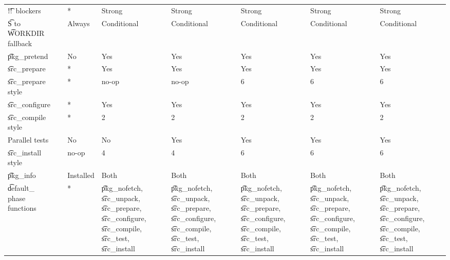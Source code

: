 \begin{landscape}
\begin{longtable}{llP{7.5em}P{7.5em}P{7.5em}P{7.5em}P{7.5em}P{7.5em}}
\t{!!}\ blockers &  &
    * & Strong & Strong & Strong & Strong & Strong \\

\t{S} to \t{WORKDIR} fallback &  &
    Always & Conditional & Conditional & Conditional & Conditional & Conditional \\

\t{pkg_pretend} &  &
    No & Yes & Yes & Yes & Yes & Yes \\

\t{src_prepare} &  &
    * & Yes & Yes & Yes & Yes & Yes \\

\t{src_prepare} style &  &
    * & no-op & no-op & 6 & 6 & 6 \\

\t{src_configure} &  &
    * & Yes & Yes & Yes & Yes & Yes \\

\t{src_compile} style &  &
    * & 2 & 2 & 2 & 2 & 2 \\

Parallel tests &  &
    No & No & Yes & Yes & Yes & Yes \\

\t{src_install} style &  &
    no-op & 4 & 4 & 6 & 6 & 6 \\

\t{pkg_info} &  &
    Installed & Both & Both & Both & Both & Both \\

\t{default_} phase functions &  &
    * &
    \t{pkg_nofetch}, \t{src_unpack}, \t{src_prepare}, \t{src_configure},
        \t{src_compile}, \t{src_test}, \t{src_install} &
    \t{pkg_nofetch}, \t{src_unpack}, \t{src_prepare}, \t{src_configure},
        \t{src_compile}, \t{src_test}, \t{src_install} &
    \t{pkg_nofetch}, \t{src_unpack}, \t{src_prepare}, \t{src_configure},
        \t{src_compile}, \t{src_test}, \t{src_install} &
    \t{pkg_nofetch}, \t{src_unpack}, \t{src_prepare}, \t{src_configure},
        \t{src_compile}, \t{src_test}, \t{src_install} &
    \t{pkg_nofetch}, \t{src_unpack}, \t{src_prepare}, \t{src_configure},
        \t{src_compile}, \t{src_test}, \t{src_install} \\


\end{longtable}
\end{landscape}
